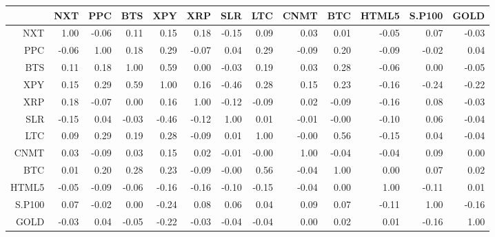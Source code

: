 \begin{table}[ht]
\centering
\begin{tabular}{rrrrrrrrrrrrr}
  \hline
 & NXT & PPC & BTS & XPY & XRP & SLR & LTC & CNMT & BTC & HTML5 & S.P100 & GOLD \\ 
  \hline
NXT & 1.00 & -0.06 & 0.11 & 0.15 & 0.18 & -0.15 & 0.09 & 0.03 & 0.01 & -0.05 & 0.07 & -0.03 \\ 
  PPC & -0.06 & 1.00 & 0.18 & 0.29 & -0.07 & 0.04 & 0.29 & -0.09 & 0.20 & -0.09 & -0.02 & 0.04 \\ 
  BTS & 0.11 & 0.18 & 1.00 & 0.59 & 0.00 & -0.03 & 0.19 & 0.03 & 0.28 & -0.06 & 0.00 & -0.05 \\ 
  XPY & 0.15 & 0.29 & 0.59 & 1.00 & 0.16 & -0.46 & 0.28 & 0.15 & 0.23 & -0.16 & -0.24 & -0.22 \\ 
  XRP & 0.18 & -0.07 & 0.00 & 0.16 & 1.00 & -0.12 & -0.09 & 0.02 & -0.09 & -0.16 & 0.08 & -0.03 \\ 
  SLR & -0.15 & 0.04 & -0.03 & -0.46 & -0.12 & 1.00 & 0.01 & -0.01 & -0.00 & -0.10 & 0.06 & -0.04 \\ 
  LTC & 0.09 & 0.29 & 0.19 & 0.28 & -0.09 & 0.01 & 1.00 & -0.00 & 0.56 & -0.15 & 0.04 & -0.04 \\ 
  CNMT & 0.03 & -0.09 & 0.03 & 0.15 & 0.02 & -0.01 & -0.00 & 1.00 & -0.04 & -0.04 & 0.09 & 0.00 \\ 
  BTC & 0.01 & 0.20 & 0.28 & 0.23 & -0.09 & -0.00 & 0.56 & -0.04 & 1.00 & 0.00 & 0.07 & 0.02 \\ 
  HTML5 & -0.05 & -0.09 & -0.06 & -0.16 & -0.16 & -0.10 & -0.15 & -0.04 & 0.00 & 1.00 & -0.11 & 0.01 \\ 
  S.P100 & 0.07 & -0.02 & 0.00 & -0.24 & 0.08 & 0.06 & 0.04 & 0.09 & 0.07 & -0.11 & 1.00 & -0.16 \\ 
  GOLD & -0.03 & 0.04 & -0.05 & -0.22 & -0.03 & -0.04 & -0.04 & 0.00 & 0.02 & 0.01 & -0.16 & 1.00 \\ 
   \hline
\end{tabular}
\end{table}
